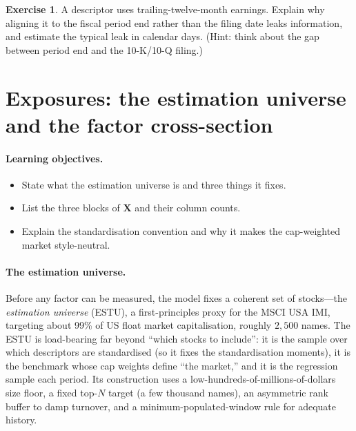 \documentclass[11pt]{article}
\theoremstyle{definition}
\newtheorem{exercise}{Exercise}[section]
\theoremstyle{plain}
\theoremstyle{remark}
\newcommand{\Xmat}{\mathbf{X}}
\begin{document}
\begin{exercise}
A descriptor uses trailing-twelve-month earnings. Explain why aligning it to the fiscal period end rather than the filing date leaks information, and estimate the typical leak in calendar days. (Hint: think about the gap between period end and the 10-K/10-Q filing.)
\end{exercise}

\section{Exposures: the estimation universe and the factor cross-section}\label{sec:expo}

\paragraph{Learning objectives.}
\begin{itemize}[leftmargin=1.4em,nosep]
  \item State what the estimation universe is and three things it fixes.
  \item List the three blocks of $\Xmat$ and their column counts.
  \item Explain the standardisation convention and why it makes the cap-weighted market style-neutral.
\end{itemize}

\paragraph{The estimation universe.} Before any factor can be measured, the model fixes a coherent set of stocks---the \emph{estimation universe} (ESTU), a first-principles proxy for the MSCI USA IMI, targeting about 99\% of US float market capitalisation, roughly $2{,}500$ names. The ESTU is load-bearing far beyond ``which stocks to include'': it is the sample over which descriptors are standardised (so it fixes the standardisation moments), it is the benchmark whose cap weights define ``the market,'' and it is the regression sample each period. Its construction uses a low-hundreds-of-millions-of-dollars size floor, a fixed top-$N$ target (a few thousand names), an asymmetric rank buffer to damp turnover, and a minimum-populated-window rule for adequate history.
\end{document}
